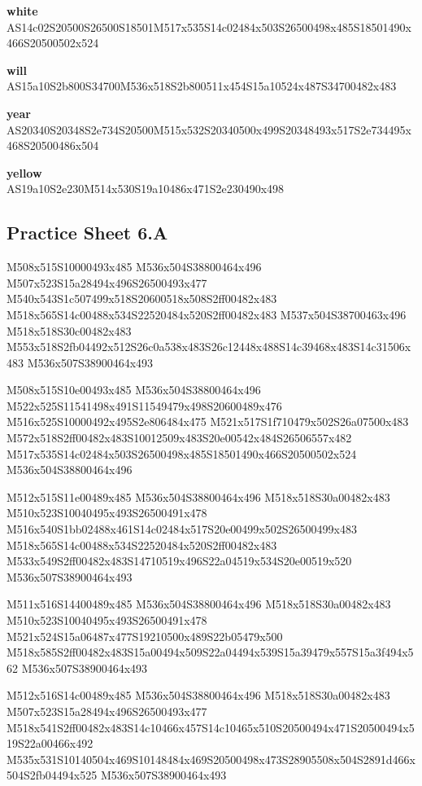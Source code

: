 \documentclass{article}
\begin{document}
\begin{glossary}
\textbf{white}\\
AS14c02S20500S26500S18501M517x535S14c02484x503S26500498x485S18501490x466S20500502x524

\textbf{will}\\
AS15a10S2b800S34700M536x518S2b800511x454S15a10524x487S34700482x483

\textbf{year}\\
AS20340S20348S2e734S20500M515x532S20340500x499S20348493x517S2e734495x468S20500486x504

\textbf{yellow}\\
AS19a10S2e230M514x530S19a10486x471S2e230490x498

\end{glossary}

\subsection{Practice Sheet 6.A}

\begin{multicols}{5}
\begin{center}

M508x515S10000493x485 %
M536x504S38800464x496 %
M507x523S15a28494x496S26500493x477 %
M540x543S1c507499x518S20600518x508S2ff00482x483 %
M518x565S14c00488x534S22520484x520S2ff00482x483 %
M537x504S38700463x496 %
M518x518S30c00482x483 %
M553x518S2fb04492x512S26c0a538x483S26c12448x488S14c39468x483S14c31506x483 %
M536x507S38900464x493 %
\vfil
\columnbreak

M508x515S10e00493x485 %
M536x504S38800464x496 %
M522x525S11541498x491S11549479x498S20600489x476 %
M516x525S10000492x495S2e806484x475 %
M521x517S1f710479x502S26a07500x483 %
M572x518S2ff00482x483S10012509x483S20e00542x484S26506557x482 %
M517x535S14c02484x503S26500498x485S18501490x466S20500502x524 %
M536x504S38800464x496 %
\vfil
\columnbreak

M512x515S11e00489x485 %
M536x504S38800464x496 %
M518x518S30a00482x483 %
M510x523S10040495x493S26500491x478 %
M516x540S1bb02488x461S14c02484x517S20e00499x502S26500499x483 %
M518x565S14c00488x534S22520484x520S2ff00482x483 %
M533x549S2ff00482x483S14710519x496S22a04519x534S20e00519x520 %
M536x507S38900464x493 %
\vfil
\columnbreak

M511x516S14400489x485 %
M536x504S38800464x496 %
M518x518S30a00482x483 %
M510x523S10040495x493S26500491x478 %
M521x524S15a06487x477S19210500x489S22b05479x500 %
M518x585S2ff00482x483S15a00494x509S22a04494x539S15a39479x557S15a3f494x562 %
M536x507S38900464x493 %
\vfil
\columnbreak

M512x516S14c00489x485 %
M536x504S38800464x496 %
M518x518S30a00482x483 %
M507x523S15a28494x496S26500493x477 %
M518x541S2ff00482x483S14c10466x457S14c10465x510S20500494x471S20500494x519S22a00466x492 %
M535x531S10140504x469S10148484x469S20500498x473S28905508x504S2891d466x504S2fb04494x525 %
M536x507S38900464x493 %
\vfil

\end{center}
\end{multicols}
\end{document}
